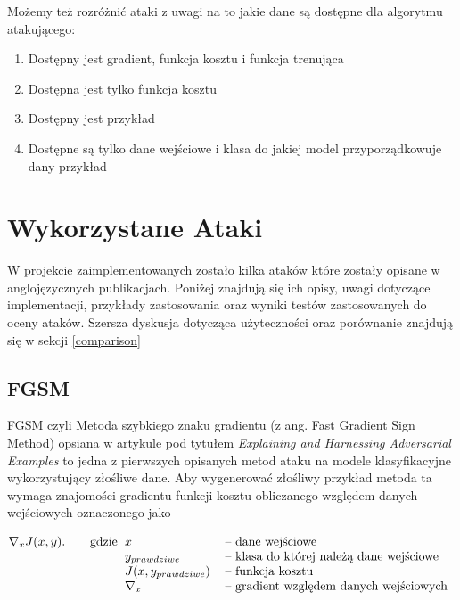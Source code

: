 \documentclass[
    left=2.5cm,         %
    right=2.5cm,        %
    top=2.5cm,          %
    bottom=3cm,         %
    bindingoffset=6mm,  %
    nohyphenation=false %
]{eiti/eiti-thesis}
\begin{document}
Możemy też rozróżnić ataki z uwagi na to jakie dane są dostępne dla algorytmu atakującego:
\begin{enumerate}
    \item Dostępny jest gradient, funkcja kosztu i funkcja trenująca
    \item Dostępna jest tylko funkcja kosztu
    \item Dostępny jest przykład
    \item Dostępne są tylko dane wejściowe i klasa do jakiej model przyporządkowuje dany przykład

\end{enumerate}


\section{Wykorzystane Ataki}
W projekcie zaimplementowanych zostało kilka ataków które zostały opisane w anglojęzycznych publikacjach.
Poniżej znajdują się ich opisy, uwagi dotyczące implementacji, przykłady zastosowania oraz wyniki testów
zastosowanych do oceny ataków. Szersza dyskusja dotycząca użyteczności oraz porównanie znajdują się w sekcji \ref{comparison}

\subsection{FGSM}
    FGSM czyli Metoda szybkiego znaku gradientu (z ang. Fast Gradient Sign Method) opsiana w artykule
    pod tytułem \textit{Explaining and Harnessing Adversarial Examples}\cite{harnessing} to jedna z pierwszych
    opisanych metod ataku na modele klasyfikacyjne wykorzystujący złośliwe dane.
    Aby wygenerować złośliwy przykład metoda ta wymaga znajomości gradientu funkcji kosztu obliczanego względem danych
    wejściowych oznaczonego jako

    \begin{equation}
        \nabla_{x} J(x, y).
        \qquad\text{gdzie}
        \begin{tabular}[t]{ll}
        $x$   & -- dane wejściowe \\
        $y_{prawdziwe}$   & -- klasa do której należą dane wejściowe\\
        $J(x, y_{prawdziwe})$  & -- funkcja kosztu \\
        $\nabla_{x}$  & -- gradient względem danych wejściowych \\
        \end{tabular}
    \end{equation}
\end{document}
